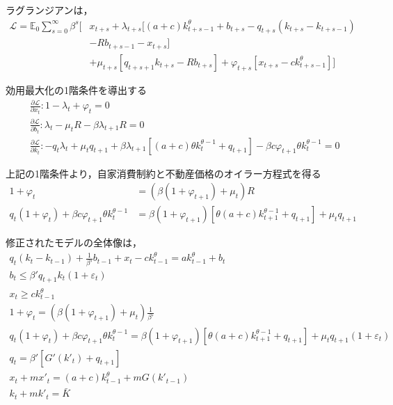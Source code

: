 \documentclass[dvipdfmx]{jlreq}
\begin{document}
ラグランジアンは，
\begin{equation}
  \begin{aligned}
    \mathcal{L} = \mathbb{E}_0 \sum_{s=0}^{\infty} \beta^s \bigg[ & x_{t+s} + \lambda_{t+s} [(a + c) k_{t+s-1}^\theta + b_{t+s} - q_{t+s} (k_{t+s} - k_{t+s-1}) \\
    &- R b_{t+s-1} - x_{t+s}] \\
    &+\mu_{t+s}[q_{t+s+1}k_{t+s} - R b_{t+s}] + \varphi_{t+s}[x_{t+s} - ck_{t+s-1}^\theta] \bigg]
  \end{aligned}
\end{equation}

効用最大化の1階条件を導出する
\begin{align}
  &\frac{\partial\mathcal{L}}{\partial x_t}: 1 - \lambda_t + \varphi_t = 0 \\
  &\frac{\partial\mathcal{L}}{\partial b_t}: \lambda_t - \mu_t R - \beta \lambda_{t+1} R = 0 \\
  &\frac{\partial\mathcal{L}}{\partial k_t}: - q_t \lambda_t + \mu_t q_{t+1} + \beta \lambda_{t+1}[(a+c) \theta k_t^{\theta-1} + q_{t+1}] - \beta c \varphi_{t+1} \theta k_t^{\theta-1} = 0
\end{align}  

上記の1階条件より，自家消費制約と不動産価格のオイラー方程式を得る
\begin{align}
  1 + \varphi_t &= (\beta(1+\varphi_{t+1}) + \mu_t) R \\
  q_t (1 + \varphi_t) + \beta c \varphi_{t+1} \theta k_t^{\theta-1} &= \beta(1 + \varphi_{t+1})[\theta (a + c) k_{t+1}^{\theta-1} + q_{t+1}] + \mu_t q_{t+1}
\end{align}

修正されたモデルの全体像は，
\begin{gather}
  q_t(k_t - k_{t-1}) + \frac{1}{\beta'} b_{t-1} + x_t - c k_{t-1}^\theta = a k_{t-1}^\theta + b_t \\
  b_t \leq \beta' q_{t+1} k_t (1+\varepsilon_t) \\
  x_t \geq c k_{t-1}^\theta \\
  1 + \varphi_t = (\beta(1+\varphi_{t+1}) + \mu_t) \frac{1}{\beta'} \\
  q_t (1 + \varphi_t) + \beta c \varphi_{t+1} \theta k_t^{\theta-1} = \beta(1 + \varphi_{t+1})[\theta (a + c) k_{t+1}^{\theta-1} + q_{t+1}] + \mu_t q_{t+1} (1+\varepsilon_t) \label{eq:5_2model5} \\
  q_t = \beta' [G'(k'_t) + q_{t+1}] \\
  x_t + m x'_t = (a + c) k_{t-1}^\theta + m G(k'_{t-1}) \\
  k_t + m k'_t = \bar{K}
\end{gather}
\end{document}
